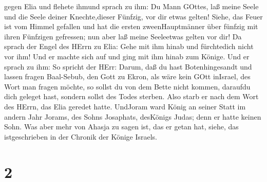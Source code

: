 gegen Elia und flehete ihmund sprach zu ihm: Du Mann GOttes, laß meine
Seele und die Seele deiner Knechte,dieser Fünfzig, vor dir etwas gelten!
 Siehe, das Feuer ist vom Himmel gefallen und hat die
ersten zweenHauptmänner über fünfzig mit ihren Fünfzigen gefressen; nun
aber laß meine Seeleetwas gelten vor dir!  Da sprach der
Engel des HErrn zu Elia: Gehe mit ihm hinab und fürchtedich nicht vor
ihm! Und er machte sich auf und ging mit ihm hinab zum Könige.
 Und er sprach zu ihm: So spricht der HErr: Darum, daß du
hast Botenhingesandt und lassen fragen Baal-Sebub, den Gott zu Ekron,
als wäre kein GOtt inIsrael, des Wort man fragen möchte, so sollst du
von dem Bette nicht kommen, daraufdu dich geleget hast, sondern sollst
des Todes sterben.  Also starb er nach dem Wort des HErrn,
das Elia geredet hatte. UndJoram ward König an seiner Statt im andern
Jahr Jorams, des Sohns Josaphats, desKönigs Judas; denn er hatte keinen
Sohn.  Was aber mehr von Ahasja zu sagen ist, das er getan
hat, siehe, das istgeschrieben in der Chronik der Könige Israels.

\hypertarget{section-1}{%
\section{2}\label{section-1}}

